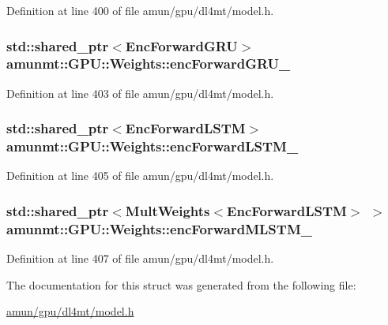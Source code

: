 Definition at line 400 of file amun/gpu/dl4mt/model.\+h.

\subsubsection[{\texorpdfstring{enc\+Forward\+G\+R\+U\+\_\+}{encForwardGRU_}}]{\setlength{\rightskip}{0pt plus 5cm}std\+::shared\+\_\+ptr$<${\bf Enc\+Forward\+G\+RU}$>$ amunmt\+::\+G\+P\+U\+::\+Weights\+::enc\+Forward\+G\+R\+U\+\_\+}\hypertarget{structamunmt_1_1GPU_1_1Weights_ae3e981d85902d35f02e4ab44074cb4f6}{}\label{structamunmt_1_1GPU_1_1Weights_ae3e981d85902d35f02e4ab44074cb4f6}


Definition at line 403 of file amun/gpu/dl4mt/model.\+h.

\subsubsection[{\texorpdfstring{enc\+Forward\+L\+S\+T\+M\+\_\+}{encForwardLSTM_}}]{\setlength{\rightskip}{0pt plus 5cm}std\+::shared\+\_\+ptr$<${\bf Enc\+Forward\+L\+S\+TM}$>$ amunmt\+::\+G\+P\+U\+::\+Weights\+::enc\+Forward\+L\+S\+T\+M\+\_\+}\hypertarget{structamunmt_1_1GPU_1_1Weights_a60e76f883e60cff698cc5894c52a5610}{}\label{structamunmt_1_1GPU_1_1Weights_a60e76f883e60cff698cc5894c52a5610}


Definition at line 405 of file amun/gpu/dl4mt/model.\+h.

\subsubsection[{\texorpdfstring{enc\+Forward\+M\+L\+S\+T\+M\+\_\+}{encForwardMLSTM_}}]{\setlength{\rightskip}{0pt plus 5cm}std\+::shared\+\_\+ptr$<${\bf Mult\+Weights}$<${\bf Enc\+Forward\+L\+S\+TM}$>$ $>$ amunmt\+::\+G\+P\+U\+::\+Weights\+::enc\+Forward\+M\+L\+S\+T\+M\+\_\+}\hypertarget{structamunmt_1_1GPU_1_1Weights_a647b55f2d86d7006c0af82d44c2081f7}{}\label{structamunmt_1_1GPU_1_1Weights_a647b55f2d86d7006c0af82d44c2081f7}


Definition at line 407 of file amun/gpu/dl4mt/model.\+h.



The documentation for this struct was generated from the following file\+:\begin{DoxyCompactItemize}
\item 
\hyperlink{amun_2gpu_2dl4mt_2model_8h}{amun/gpu/dl4mt/model.\+h}\end{DoxyCompactItemize}
